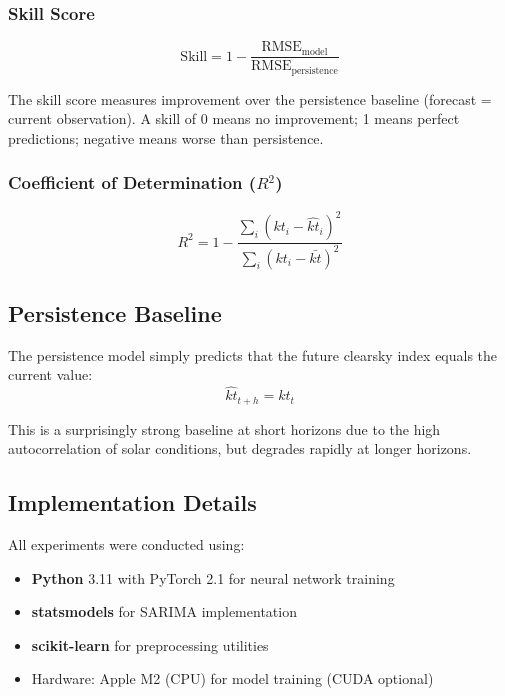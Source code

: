 \documentclass[11pt,a4paper]{article}
\begin{document}
\subsubsection{Skill Score}
\begin{equation}
    \text{Skill} = 1 - \frac{\text{RMSE}_{\text{model}}}{\text{RMSE}_{\text{persistence}}}
\end{equation}

The skill score measures improvement over the persistence baseline (forecast = current observation). A skill of 0 means no improvement; 1 means perfect predictions; negative means worse than persistence.

\subsubsection{Coefficient of Determination ($R^2$)}
\begin{equation}
    R^2 = 1 - \frac{\sum_i (kt_i - \hat{kt}_i)^2}{\sum_i (kt_i - \bar{kt})^2}
\end{equation}

\subsection{Persistence Baseline}

The persistence model simply predicts that the future clearsky index equals the current value:
\begin{equation}
    \hat{kt}_{t+h} = kt_t
\end{equation}

This is a surprisingly strong baseline at short horizons due to the high autocorrelation of solar conditions, but degrades rapidly at longer horizons.

\subsection{Implementation Details}

All experiments were conducted using:
\begin{itemize}[noitemsep]
    \item \textbf{Python} 3.11 with PyTorch 2.1 for neural network training
    \item \textbf{statsmodels} for SARIMA implementation
    \item \textbf{scikit-learn} for preprocessing utilities
    \item Hardware: Apple M2 (CPU) for model training (CUDA optional)
\end{itemize}
\end{document}
